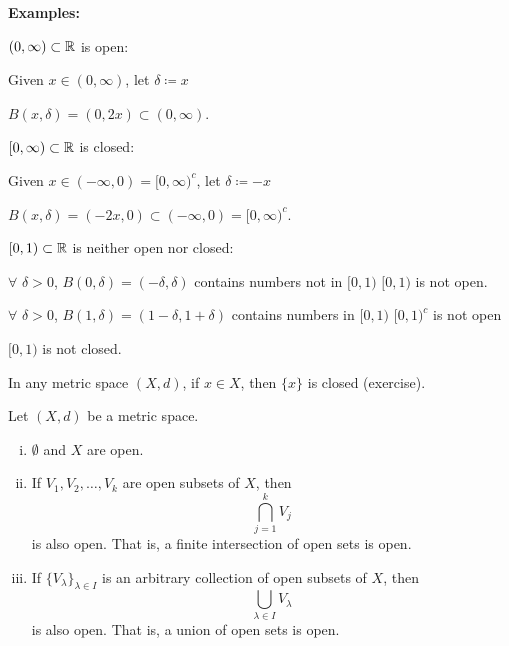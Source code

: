 \documentclass[10pt,aspectratio=169]{beamer}
\begin{document}
\begin{frame}

\textbf{Examples:}

\pause
\medskip

$(0,\infty) \subset {\mathbb{R}}$ is open:

\pause
Given $x \in (0,\infty)$,
let $\delta \coloneqq x$

\pause
\thus \quad
 $B(x,\delta) = (0,2x) \subset (0,\infty)$.

\pause
\medskip

$[0,\infty) \subset {\mathbb{R}}$ is closed:

\pause
Given $x \in (-\infty,0) =
[0,\infty)^c$,
let $\delta \coloneqq -x$

\pause
\thus \quad
 $B(x,\delta) = (-2x,0) \subset
(-\infty,0) = [0,\infty)^c$.

\pause
\medskip

$[0,1) \subset {\mathbb{R}}$ is neither open nor closed:

\pause
$\forall$ $\delta > 0$, $B(0,\delta) = (-\delta,\delta)$ contains numbers
not in $[0,1)$
\pause
\wthus $[0,1)$ is not open.

\pause
$\forall$ $\delta > 0$,
$B(1,\delta) = (1-\delta,1+\delta)$ contains
numbers in $[0,1)$
\pause
\wthus $[0,1)^c$ is not open

\pause \wthus $[0,1)$ is not closed.

\medskip
\pause

In any metric space $(X,d)$, if $x \in X$, then $\{ x \}$ is closed
(exercise).



\end{frame}

\begin{frame}
\begin{proposition}
Let $(X,d)$ be a metric space.
\begin{enumerate}[(i)]
\item
\pause
\label{topology:openi} $\emptyset$ and $X$ are open.
\item
\pause
\label{topology:openii} If $V_1, V_2, \ldots, V_k$ are open subsets of $X$, then
\begin{equation*}
\bigcap_{j=1}^k V_j
\end{equation*}
is also open.  That is, a finite intersection of open sets is open.
\item
\pause
\label{topology:openiii} If $\{ V_\lambda \}_{\lambda \in I}$ is
an arbitrary collection of open subsets of $X$, then
\begin{equation*}
\bigcup_{\lambda \in I} V_\lambda
\end{equation*}
is also open.  That is, a union of open sets is open.
\end{enumerate}
\end{proposition}


\end{frame}
\end{document}
